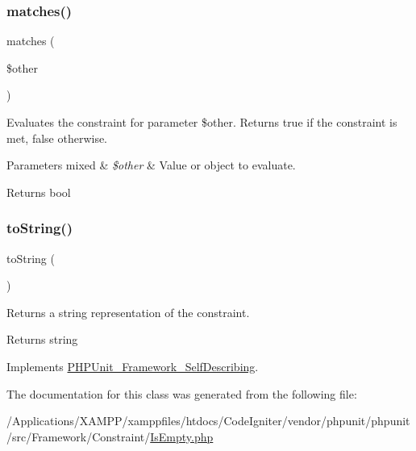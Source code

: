 \subsubsection{\texorpdfstring{matches()}{matches()}}
{\footnotesize\ttfamily matches (\begin{DoxyParamCaption}\item[{}]{\$other }\end{DoxyParamCaption})\hspace{0.3cm}{\ttfamily [protected]}}

Evaluates the constraint for parameter \$other. Returns true if the constraint is met, false otherwise.


\begin{DoxyParams}[1]{Parameters}
mixed & {\em \$other} & Value or object to evaluate.\\
\hline
\end{DoxyParams}
\begin{DoxyReturn}{Returns}
bool 
\end{DoxyReturn}
\mbox{\label{class_p_h_p_unit___framework___constraint___is_empty_a5558c5d549f41597377fa1ea8a1cefa3}} 
\subsubsection{\texorpdfstring{to\+String()}{toString()}}
{\footnotesize\ttfamily to\+String (\begin{DoxyParamCaption}{ }\end{DoxyParamCaption})}

Returns a string representation of the constraint.

\begin{DoxyReturn}{Returns}
string 
\end{DoxyReturn}


Implements \mbox{\hyperlink{interface_p_h_p_unit___framework___self_describing_a5558c5d549f41597377fa1ea8a1cefa3}{P\+H\+P\+Unit\+\_\+\+Framework\+\_\+\+Self\+Describing}}.



The documentation for this class was generated from the following file\+:\begin{DoxyCompactItemize}
\item 
/\+Applications/\+X\+A\+M\+P\+P/xamppfiles/htdocs/\+Code\+Igniter/vendor/phpunit/phpunit/src/\+Framework/\+Constraint/\mbox{\hyperlink{_is_empty_8php}{Is\+Empty.\+php}}\end{DoxyCompactItemize}
